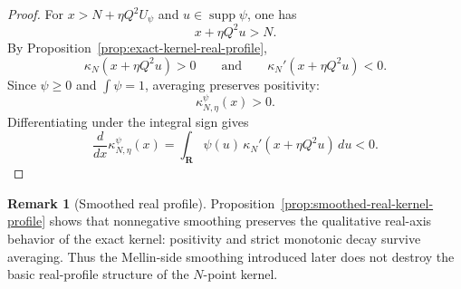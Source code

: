 \documentclass[11pt,a4paper]{amsart}
\theoremstyle{plain}
\theoremstyle{definition}
\newtheorem{remark}[theorem]{Remark}
\begin{document}
\begin{proof}
For $x>N+\eta Q^2U_\psi$ and $u\in \operatorname{supp}\psi$, one has
\[
x+\eta Q^2u>N.
\]
By Proposition~\ref{prop:exact-kernel-real-profile},
\[
\kappa_N(x+\eta Q^2u)>0
\qquad\text{and}\qquad
\kappa_N'(x+\eta Q^2u)<0.
\]
Since $\psi\ge 0$ and $\int \psi=1$, averaging preserves positivity:
\[
\kappa_{N,\eta}^{\psi}(x)>0.
\]
Differentiating under the integral sign gives
\[
\frac{d}{dx}\kappa_{N,\eta}^{\psi}(x)
=
\int_{\mathbf R}\psi(u)\,\kappa_N'(x+\eta Q^2u)\,du<0.
\]
\end{proof}

\begin{remark}[Smoothed real profile]
\label{rem:smoothed-real-kernel-profile}
Proposition~\ref{prop:smoothed-real-kernel-profile} shows that nonnegative
smoothing preserves the qualitative real-axis behavior of the exact kernel:
positivity and strict monotonic decay survive averaging. Thus the Mellin-side
smoothing introduced later does not destroy the basic real-profile structure of
the $N$-point kernel.
\end{remark}
\end{document}
